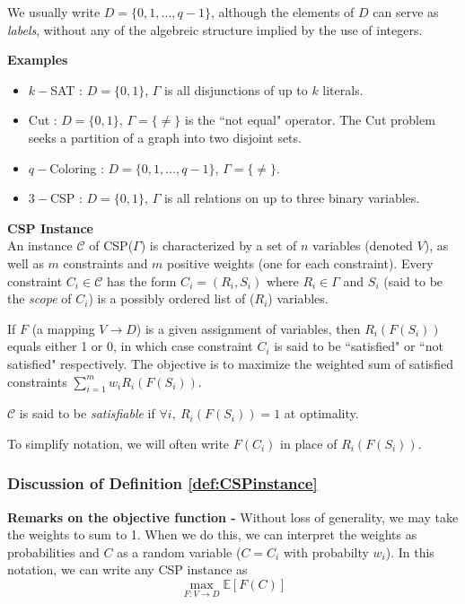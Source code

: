 We usually write $D = \{0,1,\ldots,q-1\}$, although the elements of $D$ can serve as \textit{labels}, without any of the algebreic structure implied by the use of integers.

\textbf{Examples}
\begin{itemize}
\item $k-$SAT : $D = \{0,1\}$, $\Gamma$ is all disjunctions of up to $k$ literals.
\item Cut : $D = \{0,1\}$, $\Gamma = \{\neq\}$ is the ``not equal" operator. The Cut problem seeks a partition of a graph into two disjoint sets.
\item $q-$Coloring : $D = \{0,1,\ldots,q-1\}$, $\Gamma = \{\neq\}$.
\item $3-$CSP : $D = \{0,1\}$, $\Gamma$ is all relations on up to three binary variables.
\end{itemize}

\begin{definition}
\textbf{CSP Instance}\\
An instance $\mathcal{C}$ of CSP($\Gamma$) is characterized by a set of $n$ variables (denoted $V$), as well as $m$ constraints and $m$ positive weights (one for each constraint). 
Every constraint $C_i \in \mathcal{C}$ has the form $C_i = (R_i,S_i)$ where $R_i \in \Gamma$ and $S_i$ (said to be the \textit{scope} of $C_i$) is a possibly ordered list of ($R_i$) variables. 

If $F$ (a mapping $ V\to D$) is a given assignment of variables, then $R_i(F(S_i))$ equals either 1 or 0, in which case constraint $C_i$ is said to be ``satisfied" or ``not satisfied" respectively.
The objective is to maximize the weighted sum of satisfied constraints $\sum_{i = 1}^m w_i R_i(F(S_i))$. 

$\mathcal{C}$ is said to be \textit{satisfiable} if $\forall i, ~ R_i(F(S_i)) = 1$ at optimality.
\label{def:CSPinstance}
\end{definition}
To simplify notation, we will often write $F(C_i)$ in place of $R_i(F(S_i))$.

\subsubsection{Discussion of Definition \ref{def:CSPinstance}}
\textbf{Remarks on the objective function - }Without loss of generality, we may take the weights to sum to 1. 
When we do this, we can interpret the weights as probabilities and $C$ as a random variable ($C = C_i$ with probabilty $w_i$). 
In this notation, we can write any CSP instance as
\begin{equation}
\max_{F: V \to D} \mathbb{E}\left[F(C)\right]
\end{equation}

